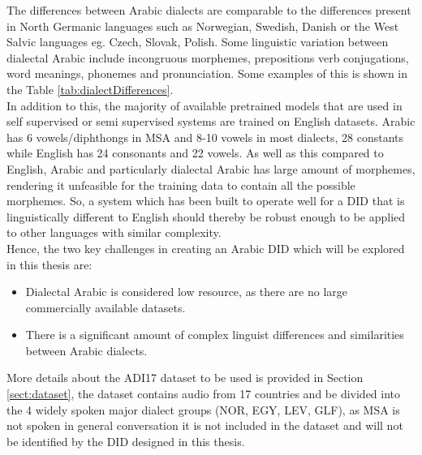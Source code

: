 The differences between Arabic dialects are comparable to the differences present in North Germanic languages such as
Norwegian, Swedish, Danish or the West Salvic languages eg. Czech, Slovak, Polish. Some linguistic variation between dialectal Arabic include incongruous morphemes, prepositions
verb conjugations, word meanings, phonemes and pronunciation. Some examples of this is shown in the Table \ref{tab:dialectDifferences}. \cite{biadsy_spoken_2009, boril_arabic_2012}\\

In addition to this, the majority of available pretrained models that are used in self supervised or semi supervised systems are trained on 
English datasets. Arabic has 6 vowels/diphthongs in MSA and 8-10 vowels in most dialects, 
28 constants while English has 24 consonants and 22 vowels. \cite{zaidan_arabic_2014}
As well as this compared to English, Arabic and particularly dialectal Arabic has large amount of morphemes, rendering 
it unfeasible for the training data to contain all the possible morphemes. So, a system which has been built to operate
well for a DID that is linguistically different to English should thereby be robust enough to be applied to other languages with similar complexity.\\ 
Hence, the two key challenges in creating an Arabic DID which will be explored in this thesis are: 
\begin{itemize}
    \item Dialectal Arabic is considered low resource, as there are no large commercially available datasets. 
    \item There is a significant amount of complex linguist differences and similarities between Arabic dialects. 
\end{itemize}
More details about the ADI17 dataset to be used is provided in Section \ref{sect:dataset}, 
the dataset contains audio from 17 countries and be divided into the 4 widely spoken major dialect groups (NOR, EGY, LEV, GLF), 
as MSA is not spoken in general conversation it is not included in the dataset and will not be identified by the DID designed in this thesis.\\
